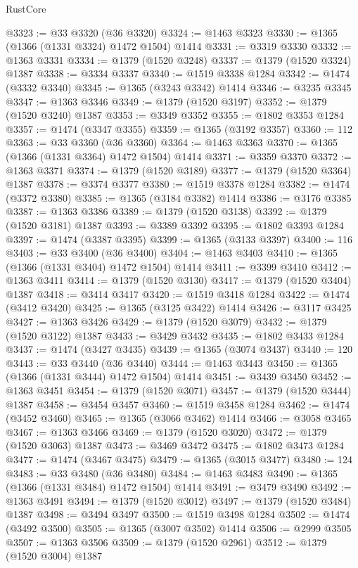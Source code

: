 \begin{lexlean}{RustCore}
\begin{coremodule}
@3323 := @33 @3320 (@36 @3320)
@3324 := @1463 @3323
@3330 := @1365 (@1366 (@1331 @3324) @1472 @1504) @1414
@3331 := @3319 @3330
@3332 := @1363 @3331
@3334 := @1379 (@1520 @3248)
@3337 := @1379 (@1520 @3324) @1387
@3338 := @3334 @3337
@3340 := @1519 @3338 @1284
@3342 := @1474 (@3332 @3340)
@3345 := @1365 (@3243 @3342) @1414
@3346 := @3235 @3345
@3347 := @1363 @3346
@3349 := @1379 (@1520 @3197)
@3352 := @1379 (@1520 @3240) @1387
@3353 := @3349 @3352
@3355 := @1802 @3353 @1284
@3357 := @1474 (@3347 @3355)
@3359 := @1365 (@3192 @3357)
@3360 := 112
@3363 := @33 @3360 (@36 @3360)
@3364 := @1463 @3363
@3370 := @1365 (@1366 (@1331 @3364) @1472 @1504) @1414
@3371 := @3359 @3370
@3372 := @1363 @3371
@3374 := @1379 (@1520 @3189)
@3377 := @1379 (@1520 @3364) @1387
@3378 := @3374 @3377
@3380 := @1519 @3378 @1284
@3382 := @1474 (@3372 @3380)
@3385 := @1365 (@3184 @3382) @1414
@3386 := @3176 @3385
@3387 := @1363 @3386
@3389 := @1379 (@1520 @3138)
@3392 := @1379 (@1520 @3181) @1387
@3393 := @3389 @3392
@3395 := @1802 @3393 @1284
@3397 := @1474 (@3387 @3395)
@3399 := @1365 (@3133 @3397)
@3400 := 116
@3403 := @33 @3400 (@36 @3400)
@3404 := @1463 @3403
@3410 := @1365 (@1366 (@1331 @3404) @1472 @1504) @1414
@3411 := @3399 @3410
@3412 := @1363 @3411
@3414 := @1379 (@1520 @3130)
@3417 := @1379 (@1520 @3404) @1387
@3418 := @3414 @3417
@3420 := @1519 @3418 @1284
@3422 := @1474 (@3412 @3420)
@3425 := @1365 (@3125 @3422) @1414
@3426 := @3117 @3425
@3427 := @1363 @3426
@3429 := @1379 (@1520 @3079)
@3432 := @1379 (@1520 @3122) @1387
@3433 := @3429 @3432
@3435 := @1802 @3433 @1284
@3437 := @1474 (@3427 @3435)
@3439 := @1365 (@3074 @3437)
@3440 := 120
@3443 := @33 @3440 (@36 @3440)
@3444 := @1463 @3443
@3450 := @1365 (@1366 (@1331 @3444) @1472 @1504) @1414
@3451 := @3439 @3450
@3452 := @1363 @3451
@3454 := @1379 (@1520 @3071)
@3457 := @1379 (@1520 @3444) @1387
@3458 := @3454 @3457
@3460 := @1519 @3458 @1284
@3462 := @1474 (@3452 @3460)
@3465 := @1365 (@3066 @3462) @1414
@3466 := @3058 @3465
@3467 := @1363 @3466
@3469 := @1379 (@1520 @3020)
@3472 := @1379 (@1520 @3063) @1387
@3473 := @3469 @3472
@3475 := @1802 @3473 @1284
@3477 := @1474 (@3467 @3475)
@3479 := @1365 (@3015 @3477)
@3480 := 124
@3483 := @33 @3480 (@36 @3480)
@3484 := @1463 @3483
@3490 := @1365 (@1366 (@1331 @3484) @1472 @1504) @1414
@3491 := @3479 @3490
@3492 := @1363 @3491
@3494 := @1379 (@1520 @3012)
@3497 := @1379 (@1520 @3484) @1387
@3498 := @3494 @3497
@3500 := @1519 @3498 @1284
@3502 := @1474 (@3492 @3500)
@3505 := @1365 (@3007 @3502) @1414
@3506 := @2999 @3505
@3507 := @1363 @3506
@3509 := @1379 (@1520 @2961)
@3512 := @1379 (@1520 @3004) @1387

\end{coremodule}
\end{lexlean}
